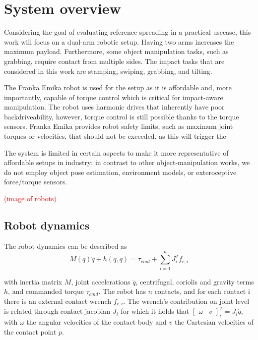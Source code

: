 \documentclass[a4paper, 10pt, conference]{ieeeconf}
\begin{document}
    \section{System overview}
    Considering the goal of evaluating reference spreading in a practical usecase, this work will focus on a dual-arm robotic setup. Having two arms increases the maximum payload. Furthermore, some object manipulation tasks, such as grabbing, require contact from multiple sides. The impact tasks that are considered in this work are stamping, swiping, grabbing, and tilting. 

    The Franka Emika robot \cite{haddadinFrankaEmikaRobot2022} is used for the setup as it is affordable and, more importantly, capable of torque control which is critical for impact-aware manipulation. The robot uses harmonic drives that inherently have poor backdriveability, however, torque control is still possible thanks to the torque sensors. Franka Emika provides robot safety limits, such as maximum joint torques or velocities, that should not be exceeded, as this will trigger the 

    The system is limited in certain aspects to make it more representative of affordable setups in industry; in contrast to other object-manipulation works, we do not employ object pose estimation, environment models, or exteroceptive force/torque sensors. 

    \textcolor{red}{(image of robots)}

    \subsection{Robot dynamics}
    The robot dynamics can be described as 
    \begin{equation}
    M(q)\ddot{q}+h(q,\dot{q})= \tau_{cmd} + \sum_{i=1}^n J_i^Tf_{c,i}
    \end{equation}
    
    with inertia matrix $M$, joint accelerations $\ddot{q}$, centrifugal, coriolis and gravity terms $h$, and commanded torque $\tau_{cmd}$. The robot has $n$ contacts, and for each contact i there is an external contact wrench $f_{c,i}$. The wrench's contribution on joint level is related through contact jacobian $J_i$ for which it holds that $\begin{bmatrix} \omega & v \end{bmatrix}_i^T=J_i\dot{q}$, with $\omega$ the angular velocities of the contact body and $v$ the Cartesian velocities of the contact point $\dot{p}$. 
\end{document}

